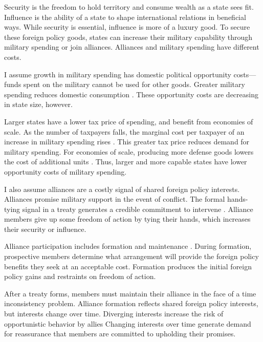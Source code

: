 \documentclass[12pt]{article}
\begin{document}
Security is the freedom to hold territory and consume wealth as a state sees fit. 
Influence is the ability of a state to shape international relations in beneficial ways. 
While security is essential, influence is more of a luxury good. 
To secure these foreign policy goods, states can increase their military capability through military spending or join alliances. 
Alliances and military spending have different costs. 


I assume growth in military spending has domestic political opportunity costs--- funds spent on the military cannot be used for other goods. 
Greater military spending reduces domestic consumption \citep{Fearon2018}. 
These opportunity costs are decreasing in state size, however. 


Larger states have a lower tax price of spending, and benefit from economies of scale. 
As the number of taxpayers falls, the marginal cost per taxpayer of an increase in military spending rises \citep{DudleyMontmarquette1981}. 
This greater tax price reduces demand for military spending. 
For economies of scale, producing more defense goods lowers the cost of additional units \citep{Moravcsik1991, AlesinaSpolaore2006}. 
Thus, larger and more capable states have lower opportunity costs of military spending. 


I also assume alliances are a costly signal of shared foreign policy interests. 
Alliances promise military support in the event of conflict. 
The formal hands-tying signal in a treaty generates a credible commitment to intervene \citep{Fearon1997, Leeds2003}.
Alliance members give up some freedom of action by tying their hands, which increases their security or influence. 


Alliance participation includes formation and maintenance \citep{Snyder1997}. 
During formation, prospective members determine what arrangement will provide the foreign policy benefits they seek at an acceptable cost. 
Formation produces the initial foreign policy gains and restraints on freedom of action. 


After a treaty forms, members must maintain their alliance in the face of a time inconsistency problem. 
Alliance formation reflects shared foreign policy interests, but interests change over time. 
Diverging interests increase the risk of opportunistic behavior by allies \citep{Leeds2003a, LeedsSavun2007}
Changing interests over time generate demand for reassurance that members are committed to upholding their promises. 
\end{document}
